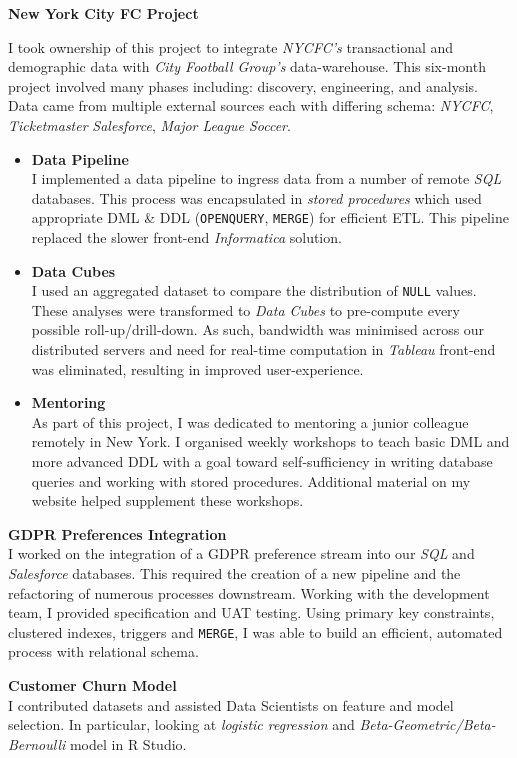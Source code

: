 \documentclass[letterpaper,11pt]{article}
\newcommand{\resumeItem}[3]{
	\item\small{
		\textbf{#1}\hfill\tiny{#2\\}\small{ #3 \vspace{-2pt}}
	}
}
\newcommand{\resumeItemListStart}{\begin{itemize}}
\newcommand{\resumeItemListEnd}{\end{itemize}\vspace{-5pt}}
\begin{document}
\resumeItem{New York City FC Project}{}
{
	I took ownership of this project to integrate \textit{NYCFC's} transactional and demographic data with \textit{City Football Group's} data-warehouse. This six-month project involved many phases including: discovery, engineering, and analysis. Data came from multiple external sources each with differing schema: \textit{NYCFC}, \textit{Ticketmaster} \textit{Salesforce}, \textit{Major League Soccer}.
	\resumeItemListStart

	\resumeItem{Data Pipeline}{}
	{
		I implemented a data pipeline to ingress data from a number of remote \textit{SQL} databases.
		This process was encapsulated in \textit{stored procedures} which used appropriate DML \& DDL (\texttt{OPENQUERY}, \texttt{MERGE}) for efficient ETL.
		\newline
		This pipeline replaced the slower front-end  \textit{Informatica} solution.
		\newline
	}
	\resumeItem{Data Cubes}{}
	{
		I used an aggregated dataset to compare the distribution of \texttt{NULL} values. These analyses were transformed to \textit{Data Cubes} to pre-compute every possible roll-up/drill-down. As such, bandwidth was minimised across our distributed servers and need for real-time computation in \textit{Tableau} front-end was eliminated, resulting in improved user-experience.
		\newline
	}
	\resumeItem{Mentoring}{}
	{
		As part of this project, I was dedicated to mentoring a junior colleague remotely in New York. I organised weekly workshops to teach basic DML and more advanced DDL with a goal toward self-sufficiency in writing database queries and working with stored procedures. Additional material on my website helped supplement these workshops.
		\newline
	}
	\resumeItemListEnd
}
\resumeItem{GDPR Preferences Integration}{}
{
	I worked on the integration of a GDPR preference stream into our \textit{SQL} and \textit{Salesforce} databases. This required the creation of a new pipeline and the refactoring of numerous processes downstream. \newline
	Working with the development team, I provided specification and UAT testing. Using primary key constraints, clustered indexes, triggers and \texttt{MERGE}, I was able to build an efficient, automated process with relational schema.
}
\resumeItem{Customer Churn Model}{}
{
	I contributed datasets and assisted Data Scientists on feature and model selection. In particular, looking at \textit{logistic regression} and \textit{Beta-Geometric/Beta-Bernoulli} model in R Studio.
}
\end{document}

